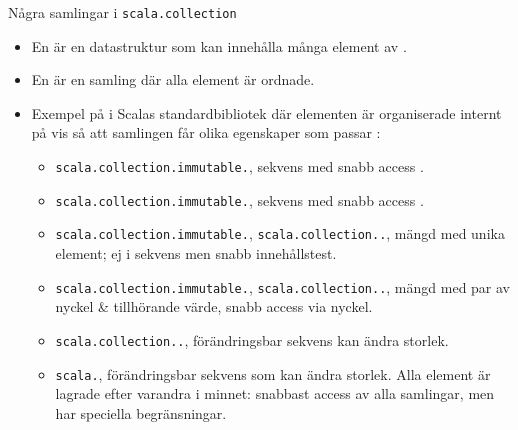 \begin{Slide}{Några samlingar i \texttt{scala.collection}}\SlideFontSmall
\SlideOnly{\setlength{\leftmargini}{0pt}}
\begin{itemize}
\item En   är en datastruktur som kan innehålla många element av .
\item En   är en samling där alla element är ordnade.

\item Exempel på  i Scalas standardbibliotek där elementen är organiserade  internt på  vis så att samlingen får olika egenskaper som passar :
\begin{itemize}\SlideFontTiny
\item \texttt{scala.collection.immutable.}, sekvens med snabb access .
\item \texttt{scala.collection.immutable.}, sekvens med snabb access .
\item \texttt{scala.collection.immutable.}, \texttt{scala.collection..}, mängd med unika element; ej i sekvens men snabb innehållstest.
\item \texttt{scala.collection.immutable.}, \texttt{scala.collection..}, mängd med par av nyckel \& tillhörande värde, snabb access via nyckel.
\item \texttt{scala.collection..}, förändringsbar sekvens kan ändra storlek.
\item \texttt{scala.}, förändringsbar sekvens som  kan ändra storlek. Alla element är lagrade efter varandra i minnet: snabbast access av alla samlingar, men har speciella begränsningar.
\end{itemize}
\end{itemize}
\end{Slide}



